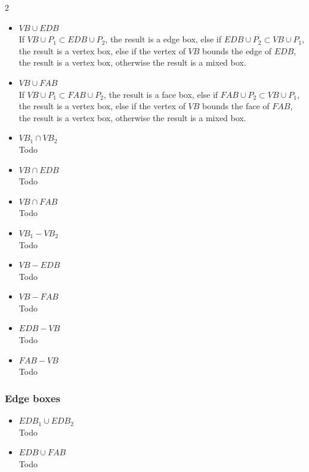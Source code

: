 \documentclass[twoside]{article}
\begin{document}
\begin{multicols}{2}
\begin{itemize}
\item $VB \cup EDB$
\\
If $VB \cup P_1 \subset EDB \cup P_2$, the result is a edge box, else if $EDB \cup P_2 \subset VB \cup P_1$, the result is a vertex box, else if the vertex of $VB$ bounds the edge of $EDB$, the result is a vertex box, otherwise the result is a mixed box.

\item $VB \cup FAB$
\\
If $VB \cup P_1 \subset FAB \cup P_2$, the result is a face box, else if $FAB \cup P_2 \subset VB \cup P_1$, the result is a vertex box, else if the vertex of $VB$ bounds the face of $FAB$, the result is a vertex box, otherwise the result is a mixed box.

\item $VB_1 \cap VB_2$
\\
Todo

\item $VB \cap EDB$
\\
Todo

\item $VB \cap FAB$
\\
Todo

\item $VB_1 - VB_2$
\\
Todo

\item $VB - EDB$
\\
Todo

\item $VB - FAB$
\\
Todo

\item $EDB - VB$
\\
Todo

\item $FAB - VB$
\\
Todo

\end{itemize}

\subsubsection{Edge boxes}
\begin{itemize}
\item $EDB_1 \cup EDB_2$
\\
Todo

\item $EDB \cup FAB$
\\
Todo


\end{itemize}
\end{multicols}
\end{document}
